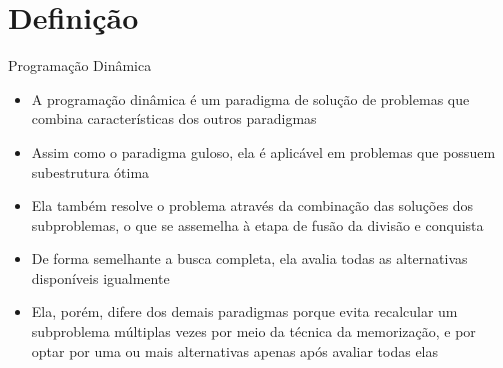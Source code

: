 \section{Definição}

\begin{frame}[fragile]{Programação Dinâmica}

    \begin{itemize}
        \item A programação dinâmica é um paradigma de solução de problemas que combina
            características dos outros paradigmas

        \item Assim como o paradigma guloso, ela é aplicável em problemas que possuem subestrutura
            ótima

        \item Ela também resolve o problema através da combinação das soluções dos subproblemas,
            o que se assemelha à etapa de fusão da divisão e conquista

        \item De forma semelhante a busca completa, ela avalia todas as alternativas disponíveis
            igualmente

        \item Ela, porém, difere dos demais paradigmas porque evita recalcular um subproblema
            múltiplas vezes por meio da técnica da memorização, e por optar por uma ou mais 
            alternativas apenas após avaliar todas elas
    \end{itemize}

\end{frame}

